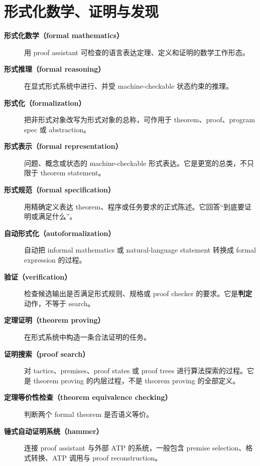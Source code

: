 \section{形式化数学、证明与发现}

\begin{description}
\item[\textbf{形式化数学（formal mathematics）}] 用 proof assistant 可检查的语言表达定理、定义和证明的数学工作形态。

\item[\textbf{形式推理（formal reasoning）}] 在显式形式系统中进行、并受 machine-checkable 状态约束的推理。

\item[\textbf{形式化（formalization）}] 把非形式对象改写为形式对象的总称，可作用于 theorem、proof、program spec 或 abstraction。

\item[\textbf{形式表示（formal representation）}] 问题、概念或状态的 machine-checkable 形式表达。它是更宽的总类，不只限于 theorem statement。

\item[\textbf{形式规范（formal specification）}] 用精确定义表达 theorem、程序或任务要求的正式陈述。它回答“到底要证明或满足什么”。

\item[\textbf{自动形式化（autoformalization）}] 自动把 informal mathematics 或 natural-language statement 转换成 formal expression 的过程。

\item[\textbf{验证（verification）}] 检查候选输出是否满足形式规则、规格或 proof checker 的要求。它是\textbf{判定}动作，不等于 search。

\item[\textbf{定理证明（theorem proving）}] 在形式系统中构造一条合法证明的任务。

\item[\textbf{证明搜索（proof search）}] 对 tactics、premises、proof states 或 proof trees 进行算法探索的过程。它是 theorem proving 的内层过程，不是 theorem proving 的全部定义。

\item[\textbf{定理等价性检查（theorem equivalence checking）}] 判断两个 formal theorem 是否语义等价。

\item[\textbf{锤式自动证明系统（hammer）}] 连接 proof assistant 与外部 ATP 的系统，一般包含 premise selection、格式转换、ATP 调用与 proof reconstruction。


\end{description}
